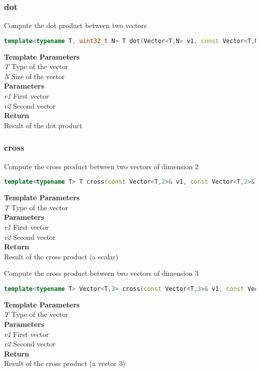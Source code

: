 \subsubsection{dot}
\begin{mdframed}
Compute the dot product between two vectors
\begin{lstlisting}[language=C++]
template<typename T, uint32_t N> T dot(Vector<T,N> v1, const Vector<T,N>& v2) 
\end{lstlisting}
\textbf{Template Parameters} \\ 
\textit{T} Type of the vector \\ 
\textit{N} Size of the vector \\ 
\textbf{Parameters} \\ 
\textit{v1} First vector \\ 
\textit{v2} Second vector \\ 
\textbf{Return} \\ 
Result of the dot product\\ 
\end{mdframed}

\subsubsection{cross}
\begin{mdframed}
Compute the cross product between two vectors of dimension 2
\begin{lstlisting}[language=C++]
template<typename T> T cross(const Vector<T,2>& v1, const Vector<T,2>& v2) 
\end{lstlisting}
\textbf{Template Parameters} \\ 
\textit{T} Type of the vector \\ 
\textbf{Parameters} \\ 
\textit{v1} First vector \\ 
\textit{v2} Second vector \\ 
\textbf{Return} \\ 
Result of the cross product (a scalar)\\ 
\end{mdframed}

\begin{mdframed}
Compute the cross product between two vectors of dimension 3
\begin{lstlisting}[language=C++]
template<typename T> Vector<T,3> cross(const Vector<T,3>& v1, const Vector<T,3>& v2) 
\end{lstlisting}
\textbf{Template Parameters} \\ 
\textit{T} Type of the vector \\ 
\textbf{Parameters} \\ 
\textit{v1} First vector \\ 
\textit{v2} Second vector \\ 
\textbf{Return} \\ 
Result of the cross product (a vector 3)\\ 
\end{mdframed}

